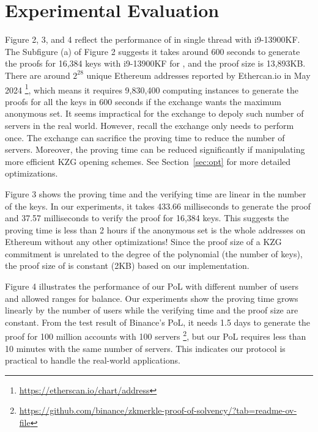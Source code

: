 \section{Experimental Evaluation}
Figure 2, 3, and 4 reflect the performance of \Sys in single thread with i9-13900KF. The Subfigure (a) of Figure 2 suggests it takes around 600 seconds to generate the proofs for 16,384 keys with i9-13900KF for \bootstrap, and the proof size is 13,893KB. There are around $2^{28}$ unique Ethereum addresses reported by Ethercan.io in May 2024 \footnote{\url{https://etherscan.io/chart/address}}, which means it requires 9,830,400 computing instances to generate the proofs for all the keys in 600 seconds if the exchange wants the maximum anonymous set. It seems impractical for the exchange to depoly such number of servers in the real world. However, recall the exchange only needs to perform \bootstrap once. The exchange can sacrifice the proving time to reduce the number of servers. Moreover, the proving time can be reduced significantly if manipulating more efficient KZG opening schemes. See Section~\ref{sec:opt} for more detailed optimizations. 

Figure 3 shows the proving time and the verifying time are linear in the number of the keys. In our experiments, it takes 433.66 milliseconds to generate the proof and 37.57 milliseconds to verify the proof for 16,384 keys. This suggests the proving time is less than 2 hours if the anonymous set is the whole addresses on Ethereum without any other optimizations! Since the proof size of a KZG commitment is unrelated to the degree of the polynomial (the number of keys), the proof size of \poa is constant (2KB) based on our implementation.

Figure 4 illustrates the performance of our PoL with different number of users and allowed ranges for balance. Our experiments show the proving time grows linearly by the number of users while the verifying time and the proof size are constant. From the test result of Binance's PoL, it needs 1.5 days to generate the proof for 100 million accounts with 100 servers \footnote{\url{https://github.com/binance/zkmerkle-proof-of-solvency/?tab=readme-ov-file}}, but our PoL requires less than 10 minutes with the same number of servers. This indicates our protocol is practical to handle the real-world applications.


